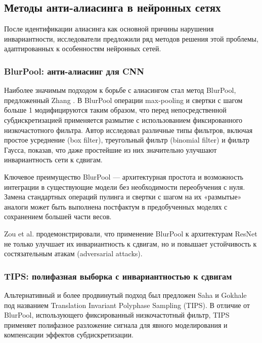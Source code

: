 \subsection{Методы анти-алиасинга в нейронных сетях}
\label{review:antialias}

После идентификации алиасинга как основной причины нарушения инвариантности, исследователи предложили ряд методов решения этой проблемы, адаптированных к особенностям нейронных сетей.

\subsubsection{BlurPool: анти-алиасинг для CNN}
\label{review:antialias:blurpool}

Наиболее значимым подходом к борьбе с алиасингом стал метод BlurPool, предложенный Zhang \cite{Zhang2019blurpool}. В BlurPool операции max-pooling и свертки с шагом больше 1 модифицируются таким образом, что перед непосредственной субдискретизацией применяется размытие с использованием фиксированного низкочастотного фильтра. Автор исследовал различные типы фильтров, включая простое усреднение (box filter), треугольный фильтр (binomial filter) и фильтр Гаусса, показав, что даже простейшие из них значительно улучшают инвариантность сети к сдвигам.

Ключевое преимущество BlurPool — архитектурная простота и возможность интеграции в существующие модели без необходимости переобучения с нуля. Замена стандартных операций пулинга и свертки с шагом на их «размытые» аналоги может быть выполнена постфактум в предобученных моделях с сохранением большей части весов.

Zou et al. \cite{zou2020delving} продемонстрировали, что применение BlurPool к архитектурам ResNet не только улучшает их инвариантность к сдвигам, но и повышает устойчивость к состязательным атакам (adversarial attacks).

\subsubsection{TIPS: полифазная выборка с инвариантностью к сдвигам}
\label{review:antialias:tips}

Альтернативный и более продвинутый подход был предложен Saha и Gokhale \cite{saha2024tips} под названием Translation Invariant Polyphase Sampling (TIPS). В отличие от BlurPool, использующего фиксированный низкочастотный фильтр, TIPS применяет полифазное разложение сигнала для явного моделирования и компенсации эффектов субдискретизации.

